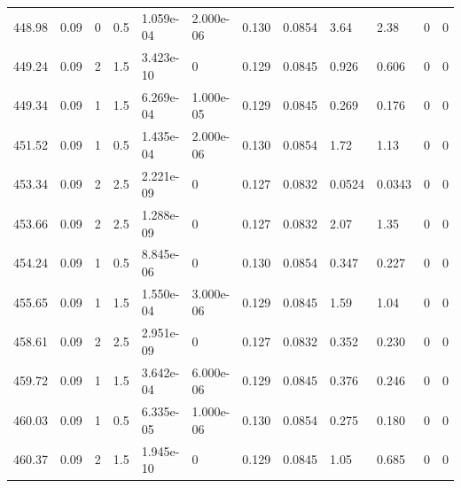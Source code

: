 \documentclass[preview]{standalone}
\begin{document}
{{{{{{{\begin{tabular}{L{1.2cm}C{1.2cm} C{0.3cm}C{0.5cm} C{1.4cm}C{1.4cm} C{1.4cm}C{1.4cm} C{1.6cm}C{1.6cm} C{1.6cm}C{1.6cm}}
  448.98  &  0.09  & 0     & 0.5 &  1.059e-04  & 2.000e-06  &  0.130&   0.0854& 3.64 & 2.38   &  0 & 0  \\ 
  449.24  &  0.09  & 2     & 1.5 &  3.423e-10  & 0  &  0.129&   0.0845& 0.926 & 0.606   &  0 & 0  \\ 
  449.34  &  0.09  & 1     & 1.5 &  6.269e-04  & 1.000e-05  &  0.129&   0.0845& 0.269 & 0.176   &  0 & 0  \\ 
  451.52  &  0.09  & 1     & 0.5 &  1.435e-04  & 2.000e-06  &  0.130&   0.0854& 1.72 & 1.13   &  0 & 0  \\ 
  453.34  &  0.09  & 2     & 2.5 &  2.221e-09  & 0  &  0.127&   0.0832& 0.0524 & 0.0343   &  0 & 0  \\ 
  453.66  &  0.09  & 2     & 2.5 &  1.288e-09  & 0  &  0.127&   0.0832& 2.07 & 1.35   &  0 & 0  \\ 
  454.24  &  0.09  & 1     & 0.5 &  8.845e-06  & 0  &  0.130&   0.0854& 0.347 & 0.227   &  0 & 0  \\ 
  455.65  &  0.09  & 1     & 1.5 &  1.550e-04  & 3.000e-06  &  0.129&   0.0845& 1.59 & 1.04   &  0 & 0  \\ 
  458.61  &  0.09  & 2     & 2.5 &  2.951e-09  & 0  &  0.127&   0.0832& 0.352 & 0.230   &  0 & 0  \\ 
  459.72  &  0.09  & 1     & 1.5 &  3.642e-04  & 6.000e-06  &  0.129&   0.0845& 0.376 & 0.246   &  0 & 0  \\ 
  460.03  &  0.09  & 1     & 0.5 &  6.335e-05  & 1.000e-06  &  0.130&   0.0854& 0.275 & 0.180   &  0 & 0  \\ 
  460.37  &  0.09  & 2     & 1.5 &  1.945e-10  & 0  &  0.129&   0.0845& 1.05 & 0.685   &  0 & 0  \\ 
\hline 
\end{tabular} 

}}}}}}}
\end{document}
